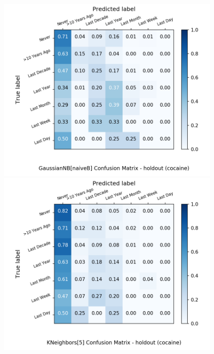 \begin{figure}[H]
	\begin{minipage}[b]{0.32\textwidth}
		\includegraphics[width=1.1\textwidth]{Plots/drugs/cocaine_GaussianNB_naiveB_balance_False_holdout.png}
	\end{minipage}
	\begin{minipage}[b]{0.32\textwidth}
		\includegraphics[width=1.1\textwidth]{Plots/drugs/cocaine_KNeighbors_5_balance_False_holdout.png}
  \end{minipage}
	\begin{minipage}[b]{0.32\textwidth}

\end{minipage}
\end{figure}
